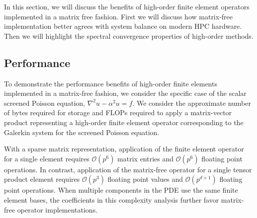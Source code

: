 In this section, we will discuss the benefits of high-order finite element operators implemented in a matrix free fashion.
First we will discuss how matrix-free implementation better agrees with system balance on modern HPC hardware.
Then we will highlight the spectral convergence properties of high-order methods.

\subsection{Performance}

To demonstrate the performance benefits of high-order finite elements implemented in a matrix-free fashion, we consider the specific case of the scalar screened Poisson equation, $\nabla^2 u - \alpha^2 u = f$.
We consider the approximate number of bytes required for storage and FLOPs required to apply a matrix-vector product representing a high-order finite element operator corresponding to the Galerkin system for the screened Poisson equation.

With a sparse matrix representation, application of the finite element operator for a single element requires $\mathcal{O} \left( p^6 \right)$ matrix entries and $\mathcal{O} \left( p^6 \right)$ floating point operations.
In contrast, application of the matrix-free operator for a single tensor product element requires $\mathcal{O} \left( p^3 \right)$ floating point values and $\mathcal{O} \left( p^{d + 1} \right)$ floating point operations.
When multiple components in the PDE use the same finite element bases, the coefficients in this complexity analysis further favor matrix-free operator implementations.

